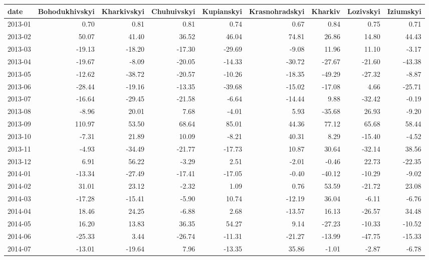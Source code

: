 \begin{table}[ht]
\centering
\begin{tabular}{lrrrrrrrr}
  \hline
date & Bohodukhivskyi & Kharkivskyi & Chuhuivskyi & Kupianskyi & Krasnohradskyi & Kharkiv & Lozivskyi & Iziumskyi \\ 
  \hline
2013-01 & 0.70 & 0.81 & 0.81 & 0.74 & 0.67 & 0.84 & 0.75 & 0.71 \\ 
  2013-02 & 50.07 & 41.40 & 36.52 & 46.04 & 74.81 & 26.86 & 14.80 & 44.43 \\ 
  2013-03 & -19.13 & -18.20 & -17.30 & -29.69 & -9.08 & 11.96 & 11.10 & -3.17 \\ 
  2013-04 & -19.67 & -8.09 & -20.05 & -14.33 & -30.72 & -27.67 & -21.60 & -43.38 \\ 
  2013-05 & -12.62 & -38.72 & -20.57 & -10.26 & -18.35 & -49.29 & -27.32 & -8.87 \\ 
  2013-06 & -28.44 & -19.16 & -13.35 & -39.68 & -15.02 & -17.08 & 4.66 & -25.71 \\ 
  2013-07 & -16.64 & -29.45 & -21.58 & -6.64 & -14.44 & 9.88 & -32.42 & -0.19 \\ 
  2013-08 & -8.96 & 20.01 & 7.68 & -4.01 & 5.93 & -35.68 & 26.93 & -9.20 \\ 
  2013-09 & 110.97 & 53.50 & 68.64 & 85.01 & 44.36 & 77.12 & 65.68 & 58.44 \\ 
  2013-10 & -7.31 & 21.89 & 10.09 & -8.21 & 40.31 & 8.29 & -15.40 & -4.52 \\ 
  2013-11 & -4.93 & -34.49 & -21.77 & -17.73 & 10.87 & 30.64 & -32.14 & 38.56 \\ 
  2013-12 & 6.91 & 56.22 & -3.29 & 2.51 & -2.01 & -0.46 & 22.73 & -22.35 \\ 
  2014-01 & -13.34 & -27.49 & -17.41 & -17.05 & -0.40 & -40.12 & -10.29 & -9.02 \\ 
  2014-02 & 31.01 & 23.12 & -2.32 & 1.09 & 0.76 & 53.59 & -21.72 & 23.08 \\ 
  2014-03 & -17.28 & -15.41 & -5.90 & 10.74 & -12.19 & 36.04 & -6.11 & -6.76 \\ 
  2014-04 & 18.46 & 24.25 & -6.88 & 2.68 & -13.57 & 16.13 & -26.57 & 34.48 \\ 
  2014-05 & 16.20 & 13.83 & 36.35 & 54.27 & 9.14 & -27.23 & -10.33 & -10.52 \\ 
  2014-06 & -25.33 & 3.44 & -26.74 & -11.31 & -21.27 & -13.99 & -47.75 & -15.33 \\ 
  2014-07 & -13.01 & -19.64 & 7.96 & -13.35 & 35.86 & -1.01 & -2.87 & -6.78 \\ 

\end{tabular}
\end{table}
